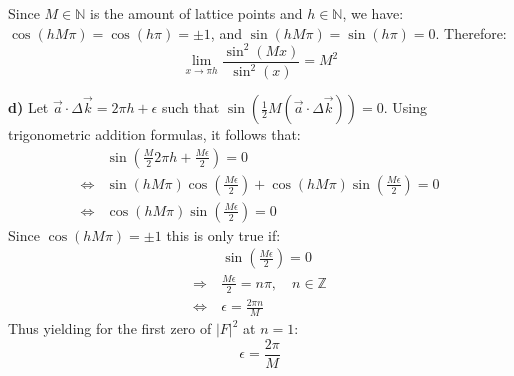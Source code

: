 \documentclass[12pt]{article}
\begin{document}
Since $M \in \mathbb{N}$ is the amount of lattice points and $h \in \mathbb{N}$, we have: $\cos(hM\pi) = \cos(h\pi) = \pm 1$, and $\sin(hM\pi) = \sin(h\pi) = 0$. Therefore:
\begin{equation}
    \lim_{x\rightarrow \pi h} \frac{\sin^2(Mx)}{\sin^2(x)} = M^2
\end{equation}

\textbf{d)} Let $\Vec{a} \cdot \Delta\Vec{k} = 2\pi h + \epsilon$ such that $\sin\left( \frac{1}{2}M(\Vec{a} \cdot \Delta\Vec{k})\right) = 0$. Using trigonometric addition formulas, it follows that:
\begin{align}
    &\sin \left( \frac{M}{2} 2\pi h + \frac{M\epsilon}{2} \right) = 0 \\
    \Leftrightarrow  &\sin(hM\pi) \cos \left( \frac{M\epsilon}{2} \right) + \cos(hM\pi) \sin \left( \frac{M\epsilon}{2} \right) = 0 \\
    \Leftrightarrow &\cos(hM\pi) \sin \left( \frac{M\epsilon}{2} \right) = 0
\end{align}
Since $\cos(hM\pi) = \pm 1$ this is only true if:
\begin{align}
    &\sin \left( \frac{M\epsilon}{2} \right) = 0 \\
    \Rightarrow \ &\frac{M\epsilon}{2} = n\pi, \quad n\in \mathbb{Z} \\
    \Leftrightarrow \ &\epsilon = \frac{2 \pi n}{M}
\end{align}
Thus yielding for the first zero of $|F|^2$ at $n = 1$:
\begin{equation}
    \epsilon = \frac{2\pi}{M}
\end{equation}
\end{document}
